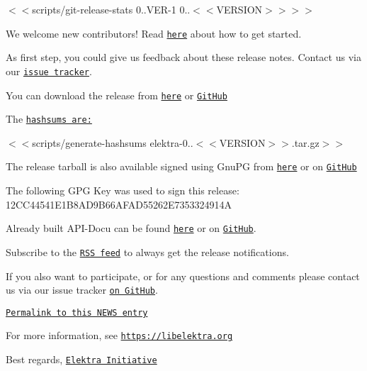 $<$$<${\ttfamily scripts/git-\/release-\/stats 0..\+V\+ER-\/1 0..$<$$<$V\+E\+R\+S\+I\+ON$>$$>$}$>$$>$

We welcome new contributors! Read \href{https://www.libelektra.org/devgettingstarted/ideas}{\tt here} about how to get started.

As first step, you could give us feedback about these release notes. Contact us via our \href{https://issues.libelektra.org}{\tt issue tracker}.

You can download the release from \href{https://www.libelektra.org/ftp/elektra/releases/elektra-0.9.<<VERSION>>.tar.gz}{\tt here} or \href{https://github.com/ElektraInitiative/ftp/blob/master/releases/elektra-0.9.<<VERSION>>.tar.gz?raw=true}{\tt Git\+Hub}

The \href{https://github.com/ElektraInitiative/ftp/blob/master/releases/elektra-0.9.<<VERSION>>.tar.gz.hashsum?raw=true}{\tt hashsums are\+:}

$<$$<${\ttfamily scripts/generate-\/hashsums elektra-\/0..$<$$<$V\+E\+R\+S\+I\+ON$>$$>$.tar.\+gz}$>$$>$

The release tarball is also available signed using Gnu\+PG from \href{https://www.libelektra.org/ftp/elektra/releases/elektra-0.9.<<VERSION>>.tar.gz.gpg}{\tt here} or on \href{https://github.com/ElektraInitiative/ftp/blob/master/releases/elektra-0.9.<<VERSION>>.tar.gz.gpg?raw=true}{\tt Git\+Hub}

The following G\+PG Key was used to sign this release\+: 12\+C\+C44541\+E1\+B8\+A\+D9\+B66\+A\+F\+A\+D55262\+E7353324914A

Already built A\+P\+I-\/\+Docu can be found \href{https://doc.libelektra.org/api/0.9.<<VERSION>>/html/}{\tt here} or on \href{https://github.com/ElektraInitiative/doc/tree/master/api/0.9.<<VERSION>}{\tt Git\+Hub}.

Subscribe to the \href{https://www.libelektra.org/news/feed.rss}{\tt R\+SS feed} to always get the release notifications.

If you also want to participate, or for any questions and comments please contact us via our issue tracker \href{http://issues.libelektra.org}{\tt on Git\+Hub}.

\href{https://www.libelektra.org/news/0.9.<<VERSION>>-release}{\tt Permalink to this N\+E\+WS entry}

For more information, see \href{https://libelektra.org}{\tt https\+://libelektra.\+org}

Best regards, \href{https://www.libelektra.org/developers/authors}{\tt Elektra Initiative} 